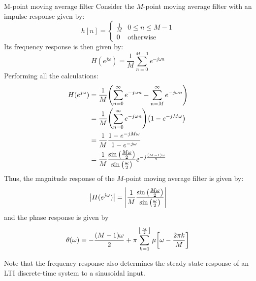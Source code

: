 \documentclass[../../main/main.tex]{subfiles}
\begin{document}
\begin{example}{M-point moving average filter}{}
    Consider the \( M \)-point moving average filter with an impulse response given by:
    \begin{equation}
        h[n]
        =
        \begin{cases}
            \frac{1}{M} &   0 \le n \le M-1 \\
            0   &   \text{otherwise}
        \end{cases}
        \label{eq:L09_S40_1}
    \end{equation}
    Its frequency response is then given by:
    \begin{equation}
        H(e^{j\omega})
        =
        \frac{1}{M} \sum_{n=0}^{M-1} e^{-j\omega n}
        \label{eq:L09_S40_2}
    \end{equation}
    Performing all the calculations:
    \begin{align}
        H(e^{j\omega})
        &=
            \frac{1}{M} \qty(\sum_{n=0}^{\infty} e^{-j\omega n}  -  \sum_{n=M}^{\infty} e^{-j\omega n})    \nonumber   \\
        &=
            \frac{1}{M} \qty(\sum_{n=0}^{\infty} e^{-j\omega n}) \qty(1 - e^{-jM\omega}) \nonumber   \\
        &=
            \frac{1}{M} \frac{1 - e^{-jM\omega}}{1 - e^{-j\omega}}  \nonumber   \\
        &=
            \frac{1}{M} \frac{\sin\qty(\frac{M\omega}{2})}{\sin\qty(\frac{\omega}{2})} e^{-j \frac{(M-1)\omega}{2}}
    \end{align}
    Thus, the magnitude response of the \( M \)-point moving average filter is given by:
    \begin{equation}
        \abs{H(e^{j\omega})}
        =
        \abs{\frac{1}{M} \frac{\sin\qty(\frac{M\omega}{2})}{\sin\qty(\frac{\omega}{2})}}
        \label{eq:L09_S42_1}
    \end{equation}
    and the phase response is given by
    \begin{equation}
        \theta(\omega)
        =
        - \frac{(M-1)\omega}{2} + \pi  \sum_{k=1}^{\left \lfloor \frac{M}{2} \right \rfloor} \mu\qty[\omega - \frac{2\pi k}{M}]
        \label{eq:L09_S42_2}
    \end{equation}
\end{example}

Note that the frequency response also determines the steady-state response of an LTI discrete-time system to a sinusoidal input.
\end{document}
